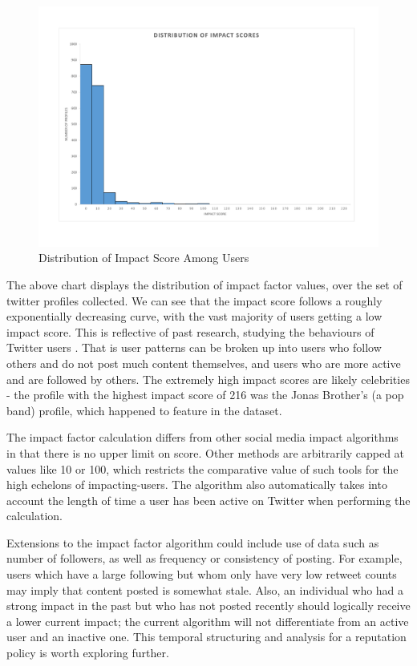 \begin{figure}[h!]
\begin{center}
\centering
\includegraphics[width=500px]{Images/impact_distribution_histogram.pdf}
\caption{Distribution of Impact Score Among Users}
\end{center}
\end{figure}

The above chart displays the distribution of impact factor values, over the set of twitter profiles collected. We can see that the impact score follows a roughly exponentially decreasing curve, with the vast majority of users getting a low impact score. This is reflective of past research, studying the behaviours of Twitter users \cite{}. That is user patterns can be broken up into users who follow others and do not post much content themselves, and users who are more active and are followed by others. The extremely high impact scores are likely celebrities - the profile with the highest impact score of 216 was the Jonas Brother's (a pop band) profile, which happened to feature in the dataset. 

The impact factor calculation differs from other social media impact algorithms in that there is no upper limit on score. Other methods are arbitrarily capped at values like 10 or 100, which restricts the comparative value of such tools for the high echelons of impacting-users. The algorithm also automatically takes into account the length of time a user has been active on Twitter when performing the calculation. 

Extensions to the impact factor algorithm could include use of data such as number of followers, as well as frequency or consistency of posting. For example, users which have a large following but whom only have very low retweet counts may imply that content posted is somewhat stale. Also, an individual who had a strong impact in the past but who has not posted recently should logically receive a lower current impact; the current algorithm will not differentiate from an active user and an inactive one. This temporal structuring and analysis for a reputation policy is worth exploring further. 

